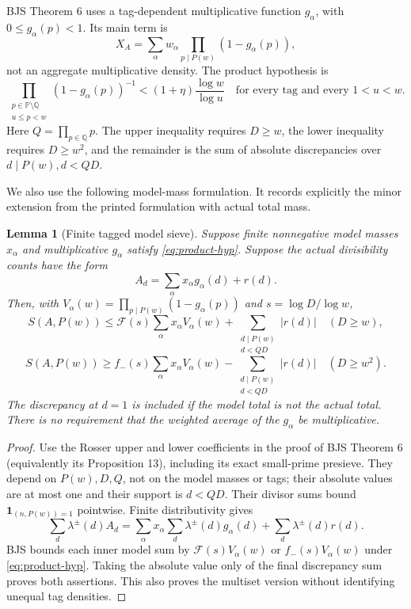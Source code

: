 \documentclass[11pt]{article}
\newtheorem{lemma}[theorem]{Lemma}
\theoremstyle{definition}
\newcommand{\ind}{\mathbf 1}
\newcommand{\Fup}{\mathcal F}
\begin{document}
BJS Theorem 6 uses a tag-dependent multiplicative function $g_\alpha$,
with $0\le g_\alpha(p)<1$.  Its main term is
\[
 X_A=\sum_\alpha w_\alpha\prod_{p\mid P(w)}(1-g_\alpha(p)),
\]
not an aggregate multiplicative density.  The product hypothesis is
\begin{equation}\label{eq:product-hyp}
 \prod_{\substack{p\in\mathbb P\setminus\mathbb Q\\u\le p<w}}
 (1-g_\alpha(p))^{-1}<(1+\eta)\frac{\log w}{\log u}
 \quad\text{for every tag and every }1<u<w.
\end{equation}
Here $Q=\prod_{p\in\mathbb Q}p$.  The upper inequality requires $D\ge w$,
the lower inequality requires $D\ge w^2$, and the remainder is the sum
of absolute discrepancies over $d\mid P(w),d<QD$.

We also use the following model-mass formulation.  It records explicitly
the minor extension from the printed formulation with actual total mass.

\begin{lemma}[Finite tagged model sieve]\label{lem:model}
Suppose finite nonnegative model masses $x_\alpha$ and multiplicative
$g_\alpha$ satisfy \eqref{eq:product-hyp}.  Suppose the actual divisibility
counts have the form
\[
 A_d=\sum_\alpha x_\alpha g_\alpha(d)+r(d).
\]
Then, with $V_\alpha(w)=\prod_{p\mid P(w)}(1-g_\alpha(p))$ and
$s=\log D/\log w$,
\[
 S(A,P(w))\le\Fup(s)\sum_\alpha x_\alpha V_\alpha(w)
               +\sum_{\substack{d\mid P(w)\\d<QD}}|r(d)|
 \quad(D\ge w),
\]
\[
 S(A,P(w))\ge f_-(s)\sum_\alpha x_\alpha V_\alpha(w)
               -\sum_{\substack{d\mid P(w)\\d<QD}}|r(d)|
 \quad(D\ge w^2).
\]
The discrepancy at $d=1$ is included if the model total is not the actual
total.  There is no requirement that the weighted average of the
$g_\alpha$ be multiplicative.
\end{lemma}
\begin{proof}
Use the Rosser upper and lower coefficients in the proof of BJS
Theorem 6 (equivalently its Proposition 13), including its exact small-prime
presieve.  They depend on $P(w),D,Q$, not on the model masses or tags;
their absolute values are at most one and their support is $d<QD$.
Their divisor sums bound $\ind_{(n,P(w))=1}$ pointwise.  Finite
distributivity gives
\[
 \sum_d\lambda^\pm(d)A_d
 =\sum_\alpha x_\alpha\sum_d\lambda^\pm(d)g_\alpha(d)
  +\sum_d\lambda^\pm(d)r(d).
\]
BJS bounds each inner model sum by $\Fup(s)V_\alpha(w)$ or
$f_-(s)V_\alpha(w)$ under \eqref{eq:product-hyp}.  Taking the absolute
value only of the final discrepancy sum proves both assertions.  This
also proves the multiset version without identifying unequal tag densities.
\end{proof}
\end{document}
